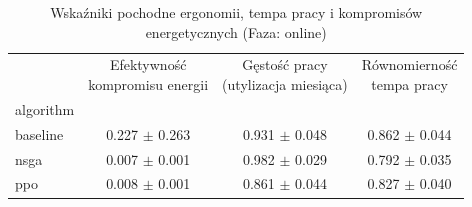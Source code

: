 
\begin{table}[htbp]
\caption{Wskaźniki pochodne ergonomii, tempa pracy i kompromisów energetycznych (Faza: online)}
\label{tab:derived_metrics_online}
\begin{tabular}{|l|c|c|c|}
\toprule
 & \makecell{Efektywność\\kompromisu energii} & \makecell{Gęstość pracy\\(utylizacja miesiąca)} & \makecell{Równomierność\\tempa pracy} \\
algorithm &  &  &  \\
\midrule
baseline & 0.227 $\pm$ 0.263 & 0.931 $\pm$ 0.048 & 0.862 $\pm$ 0.044 \\
nsga & 0.007 $\pm$ 0.001 & 0.982 $\pm$ 0.029 & 0.792 $\pm$ 0.035 \\
ppo & 0.008 $\pm$ 0.001 & 0.861 $\pm$ 0.044 & 0.827 $\pm$ 0.040 \\
\bottomrule
\end{tabular}
\end{table}
